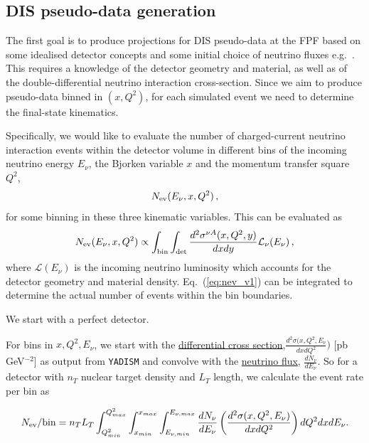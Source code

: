 \subsection{DIS pseudo-data generation}
\label{sec:pseudo-data_generation}

The first goal is to produce projections
for DIS pseudo-data at the FPF based on
some idealised detector concepts and
some initial choice of neutrino fluxes
e.g.~\cite{Kling:2021gos}.
%
This requires a knowledge of the detector geometry
and material, as well as of the double-differential
neutrino interaction cross-section. 
%
Since we aim to produce pseudo-data binned in $(x,Q^2)$,
for each simulated event we need to determine the 
final-state kinematics. 

Specifically, we would like to evaluate the
number of charged-current neutrino interaction events
within the detector volume in different bins
of the incoming neutrino energy $E_\nu$, the Bjorken
variable $x$ and the momentum transfer square $Q^2$,
\begin{equation}
    N_{\rm ev}(E_\nu, x, Q^2) \, ,
\end{equation}
for some binning in these three kinematic variables.
%
This can be evaluated as
\begin{equation}
\label{eq:nev_v1}
    N_{\rm ev}(E_\nu, x, Q^2) \propto \int_{\rm bin}\int_{\rm det}  \frac{d^2\sigma^{\nu A}(x,Q^2,y)}{dxdy} \mathcal{L}_{\nu}(E_{\nu}) \, ,
\end{equation}
where $\mathcal{L}(E_{\nu}) $ is the incoming neutrino
luminosity which accounts for the detector geometry
and material density. 
%
Eq.~(\ref{eq:nev_v1}) can be integrated to
determine the actual number of events within
the bin boundaries.

We start with a perfect detector.


For bins in $x,Q^2,E_{\nu}$, we start with the \href{https://github.com/juanrojochacon/FPF-WG1/blob/main/results/diff_xsecs_a1.txt}{differential cross section},$\frac{d^2\sigma(x,Q^2,E_{\nu}}{dxdQ^2})$ [pb GeV$^{-2}$] as output from {\tt YADISM} and convolve with the \href{https://github.com/KlingFelix/FastNeutrinoFluxSimulation/tree/main/Fluxes}{neutrino flux}, $\frac{dN_{\nu}}{dE_{\nu}}$. So for a detector with $n_T$ nuclear target density and $L_T$ length, we calculate the event rate per bin as

\begin{equation}
    N_{\rm ev}/{\rm bin} = n_T L_T\int_{Q^2_{min}}^{Q^2_{max}}\int_{x_{min}}^{x_{max}}\int_{E_{\nu,min}}^{E_{\nu , max}} \frac{dN_{\nu}}{dE_{\nu}}\left(\frac{d^2\sigma(x,Q^2,E_{\nu})}{dxdQ^2}\right) dQ^2 dx dE_{\nu}.
\end{equation}

